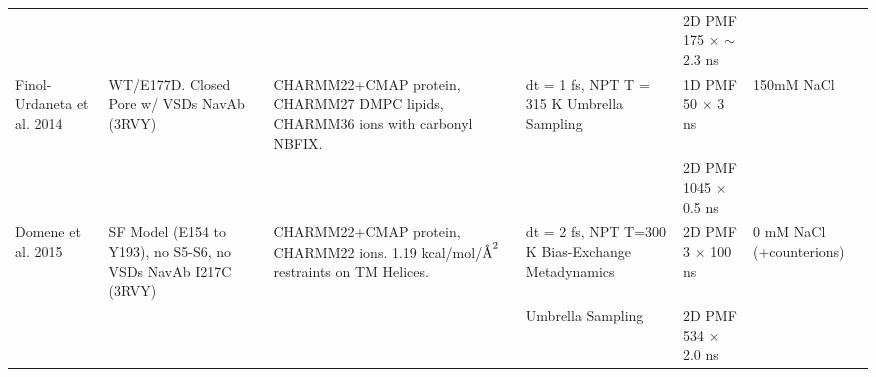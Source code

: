 \begin{refsection}
\begin{table}[]
\begin{threeparttable}
\begin{tabular}{ | p{1.5cm} | p{2.5cm} | p{3cm} | p{3cm} | p{2cm} | p{1cm} |}
                           &                                                                            &                                                                                                                                             &                                                                             & 2D PMF 175 $\times$ $\sim$2.3 ns                                                                                             &                                       \\
Finol-Urdaneta et al. 2014 & WT/E177D.  Closed Pore  w/ VSDs  NavAb (3RVY)\tnote{1}                             & CHARMM22+CMAP protein,\tnote{a} CHARMM27 DMPC lipids,\tnote{b} CHARMM36 ions with carbonyl NBFIX.\tnote{d,e}                                                        & dt = 1 fs, NPT T = 315 K  Umbrella Sampling                                 & 1D PMF 50 $\times$ 3 ns                                                                                                      & 150mM NaCl                            \\
                           &                                                                            &                                                                                                                                             &                                                                             & 2D PMF 1045 $\times$ 0.5 ns                                                                                                  &                                       \\
Domene et al. 2015         & SF Model (E154 to Y193), no S5-S6, no VSDs  NavAb I217C (3RVY)\tnote{1}            & CHARMM22+CMAP protein,\tnote{a} CHARMM22 ions.\tnote{d}  1.19 kcal/mol/$\textup{\AA}^{2}$ restraints on TM Helices.                                                        & dt = 2 fs, NPT T=300 K  Bias-Exchange Metadynamics                          & 2D PMF 3 $\times$ 100 ns                                                                                                     & 0 mM NaCl  (+counterions)             \\
                           &                                                                            &                                                                                                                                             & Umbrella Sampling                                                           & 2D PMF 534 $\times$ 2.0 ns                                                                                                   &                                       \\

\end{tabular}
\end{threeparttable}
\end{table}
\end{refsection}

